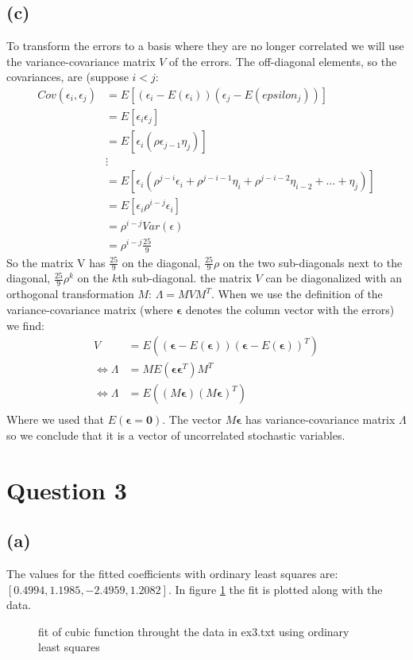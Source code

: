 \documentclass[a4paper]{article}
\begin{document}
\subsection*{(c)}
To transform the errors to a basis where they are no longer correlated we will use the variance-covariance matrix $V$ of the errors. 
The off-diagonal elements, so the covariances, are (suppose $i < j$:
\begin{align*}
	Cov(\epsilon_i, \epsilon_j) &= E[(\epsilon_i-E(\epsilon_i))(\epsilon_j-E(epsilon_j))]\\
				    &= E[\epsilon_i \epsilon_j]\\
				    &= E[\epsilon_i (\rho\epsilon_{j-1} \eta_j)]\\
				    &\vdots\\
				    &= E[\epsilon_i (\rho^{j-i} \epsilon_i + \rho^{j-i-1}\eta_i + \rho^{j-i-2}\eta_{i-2} + \ldots + \eta_j)]\\
				    &= E[\epsilon_i \rho^{i-j} \epsilon_i]\\
				    &= \rho^{i-j} Var(\epsilon)\\
				    &= \rho^{i-j} \frac{25}{9}
\end{align*}
So the matrix V has $ \frac{25}{9}$ on the diagonal, $ \frac{25}{9}\rho $ on the two sub-diagonals next to the diagonal, $ \frac{25}{9} \rho^k$ on the $k$th sub-diagonal.
the matrix $V$ can be diagonalized with an orthogonal transformation $M$: $\Lambda = MVM^T$. When we use the definition of the variance-covariance matrix (where $\mathbf{\epsilon}$ denotes the column vector with the errors) we find:
\begin{align*}
	V &= E( (\mathbf{\epsilon} - E(\mathbf{\epsilon})) (\mathbf{\epsilon} - E(\mathbf{\epsilon}))^T)\\
	\Leftrightarrow \Lambda &= M E( \mathbf{\epsilon} \mathbf{\epsilon}^T) M^T\\
	\Leftrightarrow \Lambda &= E( (M\mathbf{\epsilon})(M\mathbf{\epsilon})^T)\\
\end{align*}
Where we used that $E(\mathbf{\epsilon} = \mathbf{0})$. The vector $M \mathbf{\epsilon}$ has variance-covariance matrix $\Lambda$ so we conclude that it is a vector of uncorrelated stochastic variables.

\section*{Question 3}

\subsection*{(a)}
The values for the fitted coefficients with ordinary least squares are: $[0.4994, 1.1985, -2.4959, 1.2082]$. In figure \ref{fig:fit-3} the fit is plotted along with the data. 
\begin{figure}
	\centering
	
	\caption{fit of cubic function throught the data in ex3.txt using ordinary least squares}
	\label{fig:fit-3}
\end{figure}
\end{document}
